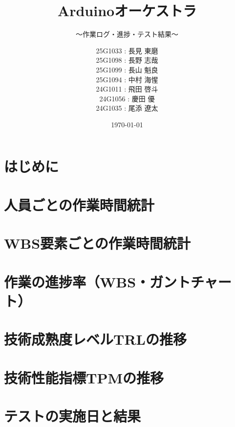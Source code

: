 \documentclass[lualatex,book,paper=a4paper,jafontsize=11.5pt,jafontscale=1.05]{jlreq}
\title{Arduinoオーケストラ}
\subtitle{〜作業ログ・進捗・テスト結果〜}
\author{
  25G1033 : 長見 東磨\\
  25G1098 : 長野 志哉\\
  25G1099 : 長山 魁良\\
  25G1094 : 中村 海惺\\
  24G1011 : 飛田 啓斗\\
  24G1056 : 慶田 優\phantom{磨}\\
  24G1035 : 尾添 遼太
}
\date{\today}
\begin{document}
\maketitle

\setcounter{tocdepth}{1}
\tableofcontents \thispagestyle{empty}

\chapter{はじめに}\setcounter{page}{1}


\chapter{人員ごとの作業時間統計}


\chapter{WBS要素ごとの作業時間統計}


\chapter{作業の進捗率（WBS・ガントチャート）}


\chapter{技術成熟度レベルTRLの推移}


\chapter{技術性能指標TPMの推移}


\chapter{テストの実施日と結果}

\end{document}
